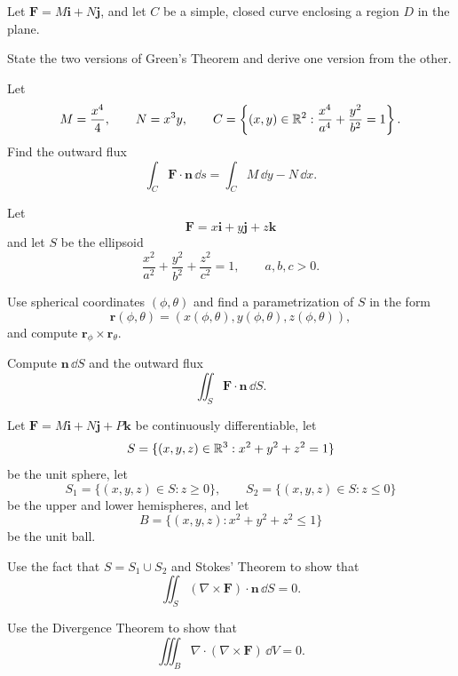 \begin{problem}
Let $\mathbf F=M\mathbf i+N\mathbf j$, and let $C$ be a simple, closed curve enclosing a region $D$ in the plane.
\begin{problemsubparts}
\item State the two versions of Green's Theorem and derive one version from the other.
\item Let
\[
M=\frac{x^4}{4},
\qquad
N=x^3y,
\qquad
C=\left\{(x,y)\in\mathbb{R}^2:\frac{x^4}{a^4}+\frac{y^2}{b^2}=1\right\}.
\]
Find the outward flux
\[
\int_C\mathbf F\cdot\mathbf n\,\dd s
=
\int_C M\,\dd y-N\,\dd x.
\]
\end{problemsubparts}
\end{problem}

\begin{problem}
Let
\[
\mathbf F=x\mathbf i+y\mathbf j+z\mathbf k
\]
and let $S$ be the ellipsoid
\[
\frac{x^2}{a^2}+\frac{y^2}{b^2}+\frac{z^2}{c^2}=1,
\qquad a,b,c>0.
\]
\begin{problemsubparts}
\item Use spherical coordinates $(\phi,\theta)$ and find a parametrization of $S$ in the form
\[
\mathbf r(\phi,\theta)
=(x(\phi,\theta),y(\phi,\theta),z(\phi,\theta)),
\]
and compute $\mathbf r_\phi\times\mathbf r_\theta$.
\item Compute $\mathbf n\,\dd S$ and the outward flux
\[
\iint_S\mathbf F\cdot\mathbf n\,\dd S.
\]
\end{problemsubparts}
\end{problem}

\begin{problem}
Let $\mathbf F=M\mathbf i+N\mathbf j+P\mathbf k$ be continuously differentiable, let
\[
S=\{(x,y,z)\in\mathbb{R}^3:x^2+y^2+z^2=1\}
\]
be the unit sphere, let
\[
S_1=\{(x,y,z)\in S:z\ge0\},
\qquad
S_2=\{(x,y,z)\in S:z\le0\}
\]
be the upper and lower hemispheres, and let
\[
B=\{(x,y,z):x^2+y^2+z^2\le1\}
\]
be the unit ball.
\begin{problemsubparts}
\item Use the fact that $S=S_1\cup S_2$ and Stokes' Theorem to show that
\[
\iint_S(\nabla\times\mathbf F)\cdot\mathbf n\,\dd S=0.
\]
\item Use the Divergence Theorem to show that
\[
\iiint_B\nabla\cdot(\nabla\times\mathbf F)\,\dd V=0.
\]
\end{problemsubparts}
\end{problem}

